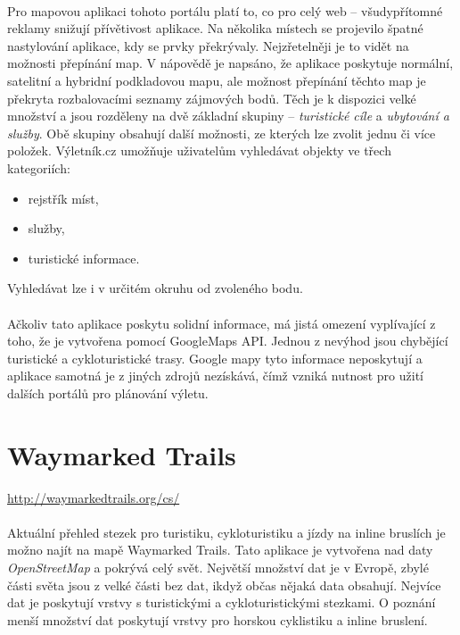 \documentclass[11pt,a4paper,titlepage,oneside]{book}
\begin{document}
		\paragraph{} Pro mapovou aplikaci tohoto portálu platí to, co pro celý web -- všudypřítomné reklamy snižují přívětivost aplikace. Na několika místech se projevilo špatné nastylování aplikace, kdy se prvky překrývaly. Nejzřetelněji je to vidět na možnosti přepínání map. V nápovědě je napsáno, že aplikace poskytuje normální, satelitní a hybridní podkladovou mapu, ale možnost přepínání těchto map je překryta rozbalovacími seznamy zájmových bodů. Těch je k dispozici velké množství a jsou rozděleny na dvě základní skupiny -- \textit{turistické cíle} a \textit{ubytování a služby}. Obě skupiny obsahují další možnosti, ze kterých lze zvolit jednu či více položek. Výletník.cz umožňuje uživatelům vyhledávat objekty ve třech kategoriích:
			\begin{itemize}
				\item rejstřík míst,
				\item služby,
				\item turistické informace.
			\end{itemize}
Vyhledávat lze i v určitém okruhu od zvoleného bodu.
		\paragraph{} Ačkoliv tato aplikace poskytu solidní informace, má jistá omezení vyplívající z toho, že je vytvořena pomocí GoogleMaps API. Jednou z nevýhod jsou chybějící turistické a cykloturistické trasy. Google mapy tyto informace neposkytují a aplikace samotná je z jiných zdrojů nezískává, čímž vzniká nutnost pro užití dalších portálů pro plánování výletu.	
	
	\section{Waymarked Trails}
		\url{http://waymarkedtrails.org/cs/}
		\paragraph{} Aktuální přehled stezek pro turistiku, cykloturistiku a jízdy na inline bruslích je možno najít na mapě Waymarked Trails\cite{Waymarked}. Tato aplikace je vytvořena nad daty \textit{OpenStreetMap} a pokrývá celý svět. Největší množství dat je v Evropě, zbylé části světa jsou z velké části bez dat, ikdyž občas nějaká data obsahují. Nejvíce dat je poskytují vrstvy s turistickými a cykloturistickými stezkami. O poznání menší množství dat poskytují vrstvy pro horskou cyklistiku a inline bruslení.
\end{document}
